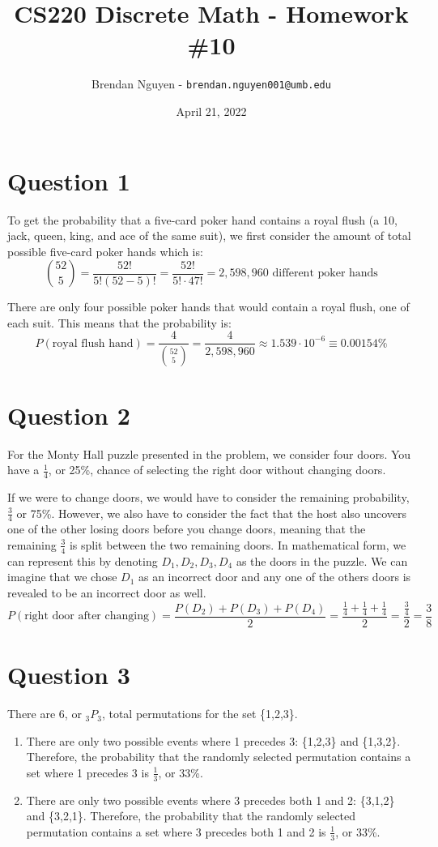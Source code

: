 \documentclass[11pt]{article}
\title{CS220 Discrete Math - Homework \#10}
\author{Brendan Nguyen - \texttt{brendan.nguyen001@umb.edu}}
\date{April 21, 2022}
\begin{document}
\maketitle

\section*{Question 1}
To get the probability that a five-card poker hand contains a royal flush (a 10, jack, queen, king, and ace of the same suit), we first consider the amount of total possible five-card poker hands which is:
\[\binom{52}{5} = \frac{52!}{5!(52-5)!} = \frac{52!}{5! \cdot 47!} = 2,598,960 \text{ different poker hands}\]

There are only four possible poker hands that would contain a royal flush, one of each suit. This means that the probability is:
\[P(\text{royal flush hand}) = \frac{4}{\binom{52}{5}} = \frac{4}{2,598,960} \approx 1.539 \cdot 10^{-6} \equiv 0.00154\%\]

\section*{Question 2}
For the Monty Hall puzzle presented in the problem, we consider four doors. You have a $\frac{1}{4}$, or 25\%, chance of selecting the right door without changing doors. 

If we were to change doors, we would have to consider the remaining probability, $\frac{3}{4}$ or 75\%. However, we also have to consider the fact that the host also uncovers one of the other losing doors before you change doors, meaning that the remaining $\frac{3}{4}$ is split between the two remaining doors. In mathematical form, we can represent this by denoting $D_1, D_2, D_3, D_4$ as the doors in the puzzle. We can imagine that we chose $D_1$ as an incorrect door and any one of the others doors is revealed to be an incorrect door as well.
\[P(\text{right door after changing}) = \frac{P(D_2) + P(D_3) + P(D_4)}{2} = \frac{\frac{1}{4} + \frac{1}{4} + \frac{1}{4}}{2} = \frac{\frac{3}{4}}{2} = \frac{3}{8}\]

\section*{Question 3}
There are 6, or $_{3}P_{3}$, total permutations for the set \{1,2,3\}.

\renewcommand{\labelenumi}{(\alph{enumi})}

\begin{enumerate}
    \item There are only two possible events where 1 precedes 3: \{1,2,3\} and \{1,3,2\}. Therefore, the probability that the randomly selected permutation contains a set where 1 precedes 3 is $\frac{1}{3}$, or 33\%.
    \item There are only two possible events where 3 precedes both 1 and 2: \{3,1,2\} and \{3,2,1\}. Therefore, the probability that the randomly selected permutation contains a set where 3 precedes both 1 and 2 is $\frac{1}{3}$, or 33\%.
\end{enumerate}
\end{document}
